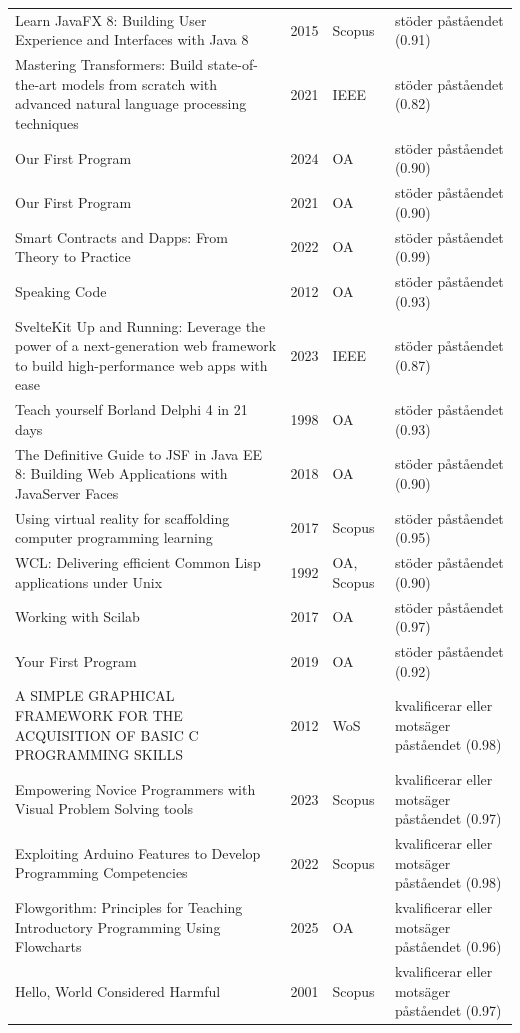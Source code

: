 \begin{longtable}{@{}%
  >{\raggedright\arraybackslash}p{}c%
  >{\raggedright\arraybackslash}p{}%
  >{\raggedright\arraybackslash}p{}@{}}
Learn JavaFX 8: Building User Experience and Interfaces with Java 8 & 2015 & Scopus & stöder påståendet (0.91) \\
Mastering Transformers: Build state-of-the-art models from scratch with advanced natural language processing techniques & 2021 & IEEE & stöder påståendet (0.82) \\
Our First Program & 2024 & OA & stöder påståendet (0.90) \\
Our First Program & 2021 & OA & stöder påståendet (0.90) \\
Smart Contracts and Dapps: From Theory to Practice & 2022 & OA & stöder påståendet (0.99) \\
Speaking Code & 2012 & OA & stöder påståendet (0.93) \\
SvelteKit Up and Running: Leverage the power of a next-generation web framework to build high-performance web apps with ease & 2023 & IEEE & stöder påståendet (0.87) \\
Teach yourself Borland Delphi 4 in 21 days & 1998 & OA & stöder påståendet (0.93) \\
The Definitive Guide to JSF in Java EE 8: Building Web Applications with JavaServer Faces & 2018 & OA & stöder påståendet (0.90) \\
Using virtual reality for scaffolding computer programming learning & 2017 & Scopus & stöder påståendet (0.95) \\
WCL: Delivering efficient Common Lisp applications under Unix & 1992 & OA, Scopus & stöder påståendet (0.90) \\
Working with Scilab & 2017 & OA & stöder påståendet (0.97) \\
Your First Program & 2019 & OA & stöder påståendet (0.92) \\
A SIMPLE GRAPHICAL FRAMEWORK FOR THE ACQUISITION OF BASIC C PROGRAMMING SKILLS & 2012 & WoS & kvalificerar eller motsäger påståendet (0.98) \\
Empowering Novice Programmers with Visual Problem Solving tools & 2023 & Scopus & kvalificerar eller motsäger påståendet (0.97) \\
Exploiting Arduino Features to Develop Programming Competencies & 2022 & Scopus & kvalificerar eller motsäger påståendet (0.98) \\
Flowgorithm: Principles for Teaching Introductory Programming Using Flowcharts & 2025 & OA & kvalificerar eller motsäger påståendet (0.96) \\
Hello, World Considered Harmful & 2001 & Scopus & kvalificerar eller motsäger påståendet (0.97) \\

\end{longtable}
